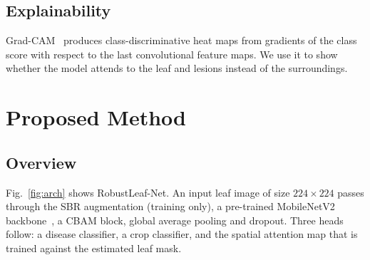 \documentclass[conference]{IEEEtran}
\begin{document}
\subsection{Explainability}
Grad-CAM~\cite{selvaraju2017} produces class-discriminative heat maps from gradients of the class score with respect to the last convolutional feature maps. We use it to show whether the model attends to the leaf and lesions instead of the surroundings.

\section{Proposed Method}
\subsection{Overview}
Fig.~\ref{fig:arch} shows RobustLeaf-Net. An input leaf image of size $224\times224$ passes through the SBR augmentation (training only), a pre-trained MobileNetV2 backbone~\cite{sandler2018}, a CBAM block, global average pooling and dropout. Three heads follow: a disease classifier, a crop classifier, and the spatial attention map that is trained against the estimated leaf mask.
\end{document}
